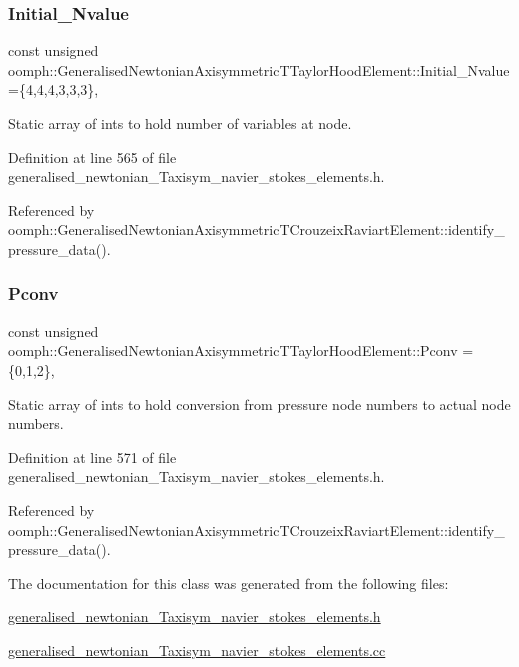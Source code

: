 \subsubsection{\texorpdfstring{Initial\+\_\+\+Nvalue}{Initial\_Nvalue}}
{\footnotesize\ttfamily const unsigned oomph\+::\+Generalised\+Newtonian\+Axisymmetric\+T\+Taylor\+Hood\+Element\+::\+Initial\+\_\+\+Nvalue =\{4,4,4,3,3,3\}\hspace{0.3cm}{\ttfamily [static]}, {\ttfamily [private]}}



Static array of ints to hold number of variables at node. 



Definition at line 565 of file generalised\+\_\+newtonian\+\_\+\+Taxisym\+\_\+navier\+\_\+stokes\+\_\+elements.\+h.



Referenced by oomph\+::\+Generalised\+Newtonian\+Axisymmetric\+T\+Crouzeix\+Raviart\+Element\+::identify\+\_\+pressure\+\_\+data().

\mbox{\label{classoomph_1_1GeneralisedNewtonianAxisymmetricTTaylorHoodElement_acd1d91d33a8a6b6a4f7ffee878512732}} 
\subsubsection{\texorpdfstring{Pconv}{Pconv}}
{\footnotesize\ttfamily const unsigned oomph\+::\+Generalised\+Newtonian\+Axisymmetric\+T\+Taylor\+Hood\+Element\+::\+Pconv =\{0,1,2\}\hspace{0.3cm}{\ttfamily [static]}, {\ttfamily [protected]}}



Static array of ints to hold conversion from pressure node numbers to actual node numbers. 



Definition at line 571 of file generalised\+\_\+newtonian\+\_\+\+Taxisym\+\_\+navier\+\_\+stokes\+\_\+elements.\+h.



Referenced by oomph\+::\+Generalised\+Newtonian\+Axisymmetric\+T\+Crouzeix\+Raviart\+Element\+::identify\+\_\+pressure\+\_\+data().



The documentation for this class was generated from the following files\+:\begin{DoxyCompactItemize}
\item 
\hyperlink{generalised__newtonian__Taxisym__navier__stokes__elements_8h}{generalised\+\_\+newtonian\+\_\+\+Taxisym\+\_\+navier\+\_\+stokes\+\_\+elements.\+h}\item 
\hyperlink{generalised__newtonian__Taxisym__navier__stokes__elements_8cc}{generalised\+\_\+newtonian\+\_\+\+Taxisym\+\_\+navier\+\_\+stokes\+\_\+elements.\+cc}\end{DoxyCompactItemize}
